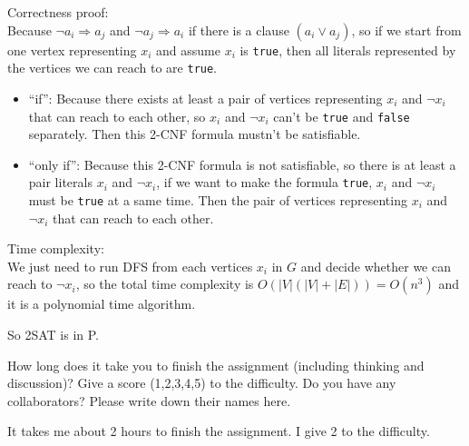 \documentclass{oxmathproblems}
\begin{document}
\begin{questions}
\begin{parts}
  Correctness proof:\\
  Because $\neg a_i\Longrightarrow a_j$ and $\neg a_j\Longrightarrow a_i$ if there is a clause $(a_i\vee a_j)$, so if we start from one vertex representing $x_i$ and assume $x_i$ is \texttt{true}, then all literals represented by the vertices we can reach to are \texttt{true}.
  \begin{itemize}
    \item ``if'': Because there exists at least a pair of vertices representing $x_i$ and $\neg x_i$ that can reach to each other, so $x_i$ and $\neg x_i$ can't be \texttt{true} and \texttt{false} separately. Then this 2-CNF formula mustn't be satisfiable.
    \item ``only if'': Because this 2-CNF formula is not satisfiable, so there is at least a pair literals $x_i$ and $\neg x_i$, if we want to make the formula \texttt{true}, $x_i$ and $\neg x_i$ must be \texttt{true} at a same time. Then the pair of vertices representing $x_i$ and $\neg x_i$ that can reach to each other.
  \end{itemize}

  Time complexity:\\
  We just need to run DFS from each vertices $x_i$ in $G$ and decide whether we can reach to $\neg x_i$, so the total time complexity is $O(|V|(|V|+|E|)) = O(n^3)$ and it is a polynomial time algorithm.

  So 2SAT is in P.
\end{parts}

\miquestion
How long does it take you to finish the assignment (including thinking and discussion)?
Give a score (1,2,3,4,5) to the difficulty.
Do you have any collaborators?
Please write down their names here.

It takes me about 2 hours to finish the assignment. I give 2 to the difficulty.

\end{questions}
\end{document}
